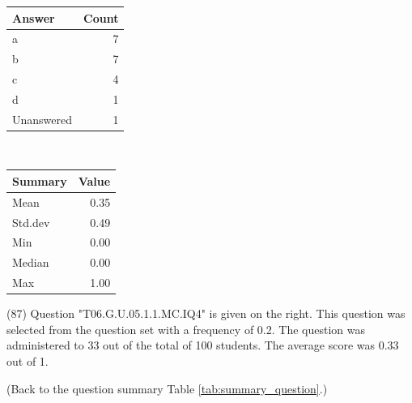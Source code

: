 \documentclass[12pt,nohyper]{tufte-handout}\usepackage[]{graphicx}\usepackage[]{color}
\begin{document}
\begin{center}%
\begin{tabular}{lr}
  \hline
Answer & Count \\ 
  \hline
a &   7 \\ 
  b &   7 \\ 
  c &   4 \\ 
  d &   1 \\ 
  Unanswered &   1 \\ 
   \hline
\end{tabular}
~~~~~~~~%
\begin{tabular}{lr}
  \hline
Summary & Value \\ 
  \hline
Mean & 0.35 \\ 
  Std.dev & 0.49 \\ 
  Min & 0.00 \\ 
  Median & 0.00 \\ 
  Max & 1.00 \\ 
   \hline
\end{tabular}
\end{center}\newpage{} (87) Question "T06.G.U.05.1.1.MC.IQ4" is given on the right. This question was selected from the question set with a frequency of 0.2. The question was administered to 33 out of the total of 100 students. The average score was 0.33 out of 1.

 (Back to the question summary Table \ref{tab:summary_question}.)
\end{document}
